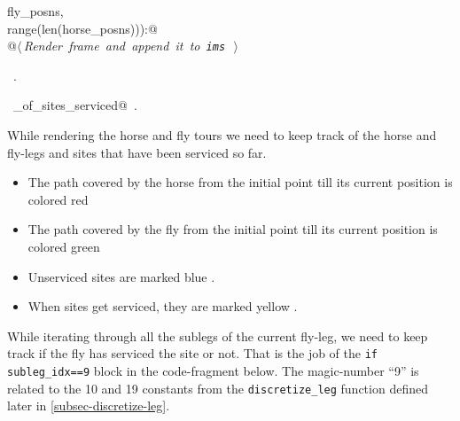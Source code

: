 \documentclass[11.5pt]{report}
\begin{document}
\begin{flushleft}
\begin{minipage}{\linewidth}
\begin{list}{}{}
\mbox{}\verb@                                                 fly_posns,   \@\\
\mbox{}\verb@                                                 range(len(horse_posns))):@\\
\mbox{}\verb@          @\hbox{$\langle\,${\itshape Render frame and append it to \verb|ims|}\nobreak\ {\footnotesize {}}$\,\rangle$}\verb@@\\
\mbox{}\verb@@{\NWsep}
\end{list}
\vspace{-1.5ex}
\footnotesize
\begin{list}{}{\setlength{\itemsep}{-\parsep}\setlength{\itemindent}{-\leftmargin}}
\item \NWtxtMacroRefIn\ .
\item \NWtxtIdentsDefed\nobreak\  \verb@number_of_sites_serviced@\nobreak\ .
\item{}
\end{list}
\end{minipage}\vspace{4ex}
\end{flushleft}
\vspace{-0.8cm} \newchunk While rendering the horse and fly tours we need to keep track of the horse and 
fly-legs and sites that have been serviced so far.  

\begin{itemize}
\item The path covered by the horse from the initial point till its current position is colored red   
\item The path covered by the fly from the initial point till its current position is colored green  
\item Unserviced sites are marked blue . 
\item When sites get serviced, they are marked yellow .
\end{itemize}

While iterating through all the sublegs of the current fly-leg, we need to keep track if the fly has serviced the site or not. That is the 
job of the \verb|if subleg_idx==9| block in the code-fragment below. The magic-number  ``9'' is related to the 10 and 19 constants from the 
\verb|discretize_leg| function defined later in \autoref{subsec-discretize-leg}. 
\end{document}
